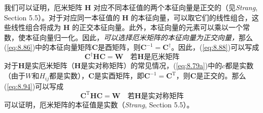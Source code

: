     我们可以证明，厄米矩阵 $\mathbf{H}$ 对应不同本征值的两个本征向量是正交的（见\textit{Strang}, Section 5.5）。对于对应同一本征值的 $\mathbf{H}$ 的本征向量，可以取它们的线性组合，这些线性组合将成为 $\mathbf{H}$ 的正交本征向量。此外，本征向量的元素可以乘以一个常数，使本征向量归一化。因此，\textit{可以选择厄米矩阵的本征向量为正交向量，}那么(\ref{eq:8.86})中的本征向量矩阵$\mathbf{C}$是酉矩阵，则$\mathbf{C}^{-1} = \mathbf{C}^{\dagger}$。因此，(\ref{eq:8.88})可以写成
    \begin{equation}
        \mathbf{C}^{\dagger}\mathbf{H}\mathbf{C} = \mathbf{W} \quad \text{若} \mathbf{H} \text{是厄米矩阵}
        \label{eq:8.94}
    \end{equation}
    对于$\mathbf{H}$是实厄米矩阵（$\mathbf{H}$是实对称矩阵）的常见情况，(\ref{eq:8.79a})中的$c$都是实数（由于$W$和$H_{ij}$都是实数），$\mathbf{C}$是实酉矩阵，即$\mathbf{C}^{-1} = \mathbf{C}^{\mathrm{T}}$，则$\mathbf{C}$是正交的。那么(\ref{eq:8.94})可以写成
    \begin{equation}
        \mathbf{C}^{\mathrm{T}}\mathbf{H}\mathbf{C} = \mathbf{W} \quad \text{若} \mathbf{H} \text{是实对称矩阵}
        \label{eq:8.95}
    \end{equation}
    可以证明，厄米矩阵的本征值是实数（\textit{Strang}, Section 5.5）。

